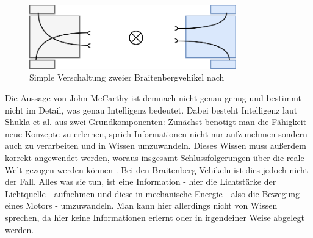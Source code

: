             \begin{figure}[h]
                \begin{center}
                    \includegraphics[width=0.8\textwidth]{figures/braitenberg-roboter.png}
                    \caption[Verschaltung Braitenberg-Vehikel]{Simple Verschaltung zweier Braitenbergvehikel nach \cite{ertel2016grundkurs}}
                    \label{pic:braitenberg-vehikel}
                \end{center}
            \end{figure}

            Die Aussage von John McCarthy ist demnach nicht genau genug und bestimmt nicht im Detail, was genau Intelligenz
            bedeutet. Dabei besteht Intelligenz laut Shukla et al. aus zwei Grundkomponenten: Zunächst benötigt man die
            Fähigkeit neue Konzepte zu erlernen, sprich Informationen nicht nur aufzunehmen sondern auch zu verarbeiten
            und in Wissen umzuwandeln. Dieses Wissen muss außerdem korrekt angewendet werden, woraus insgesamt
            Schlussfolgerungen über die reale Welt gezogen werden können \cite{shukla2013applicability}. Bei den Braitenberg
            Vehikeln ist dies jedoch nicht der Fall. Alles was sie tun, ist eine Information - hier die Lichtstärke der
            Lichtquelle - aufnehmen und diese in mechanische Energie - also die Bewegung eines Motors - umzuwandeln.
            Man kann hier allerdings nicht von Wissen sprechen, da hier keine Informationen erlernt oder in irgendeiner
            Weise abgelegt werden.

